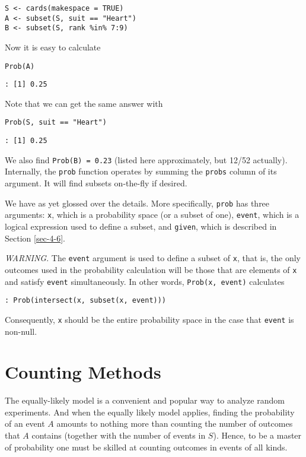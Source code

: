 \begin{verbatim}
S <- cards(makespace = TRUE) 
A <- subset(S, suit == "Heart") 
B <- subset(S, rank %in% 7:9)
\end{verbatim}

Now it is easy to calculate 

\begin{verbatim}
Prob(A) 
\end{verbatim}

\begin{verbatim}
: [1] 0.25
\end{verbatim}

Note that we can get the same answer with 

\begin{verbatim}
Prob(S, suit == "Heart") 
\end{verbatim}

\begin{verbatim}
: [1] 0.25
\end{verbatim}

We also find \texttt{Prob(B) = 0.23} (listed here approximately, but
12/52 actually). Internally, the \texttt{prob} function operates by summing
the \texttt{probs} column of its argument. It will find subsets on-the-fly if
desired.

We have as yet glossed over the details. More specifically, \texttt{prob} has
three arguments: \texttt{x}, which is a probability space (or a subset of
one), \texttt{event}, which is a logical expression used to define a subset,
and \texttt{given}, which is described in Section \ref{sec-4-6}.

\emph{WARNING}. The \texttt{event} argument is used to define a subset of \texttt{x},
that is, the only outcomes used in the probability calculation will be
those that are elements of \texttt{x} and satisfy \texttt{event} simultaneously. In
other words, \texttt{Prob(x, event)} calculates

\begin{verbatim}
: Prob(intersect(x, subset(x, event)))
\end{verbatim}

Consequently, \texttt{x} should be the entire probability space in the case
that \texttt{event} is non-null.

\section{Counting Methods}
\label{sec-4-5}

The equally-likely model is a convenient and popular way to analyze
random experiments. And when the equally likely model applies, finding
the probability of an event \(A\) amounts to nothing more than
counting the number of outcomes that \(A\) contains (together with the
number of events in \(S\)). Hence, to be a master of probability one
must be skilled at counting outcomes in events of all kinds.

